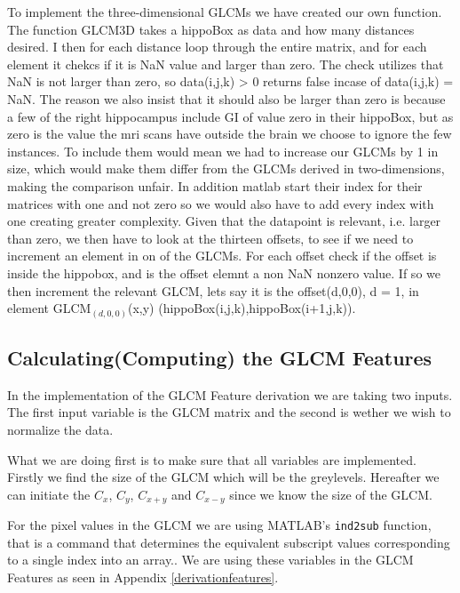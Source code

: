 To implement the three-dimensional GLCMs we have created our own function.
The function GLCM3D takes a hippoBox as data and how many distances desired. I then for each distance loop through the entire matrix, and for each element it chekcs if it is NaN value and larger than zero. The check utilizes that NaN is not larger than zero, so data(i,j,k) > 0 returns false incase of data(i,j,k) = NaN.
The reason we also insist that it should also be larger than zero is because a few of the right hippocampus include GI of value zero in their hippoBox, but as zero is the value the mri scans have outside the brain we choose to ignore the few instances. To include them would mean we had to increase our GLCMs by 1 in size, which would make them differ from the GLCMs derived in two-dimensions, making the comparison unfair. In addition matlab start their index for their matrices with one and not zero so we would also have to add every index with one creating greater complexity.
Given that the datapoint is relevant, i.e. larger than zero, we then have to look at the thirteen offsets, to see if we need to increment an element in on of the GLCMs. For each offset check if the offset is inside the hippobox, and is the offset elemnt a non NaN nonzero value. If so we then increment the relevant GLCM, lets say it is the offset(d,0,0), d = 1, in element GLCM$_(d,0,0)$(x,y) (hippoBox(i,j,k),hippoBox(i+1,j,k)).


\subsection{Calculating(Computing) the GLCM Features}


In the implementation of the GLCM Feature derivation we are taking two inputs. The first input variable is the GLCM matrix and the second is wether we wish to normalize the data.

What we are doing first is to make sure that all variables are implemented. Firstly we find the size of the GLCM which will be the greylevels. Hereafter we can initiate the $C_x$, $C_y$, $C_{x+y}$ and $C_{x-y}$ since we know the size of the GLCM.

For the pixel values in the GLCM we are using MATLAB's \texttt{ind2sub} function, that is a command that determines the equivalent subscript values corresponding to a single index into an array.. We are using these variables in the GLCM Features as seen in Appendix \ref{derivationfeatures}.

